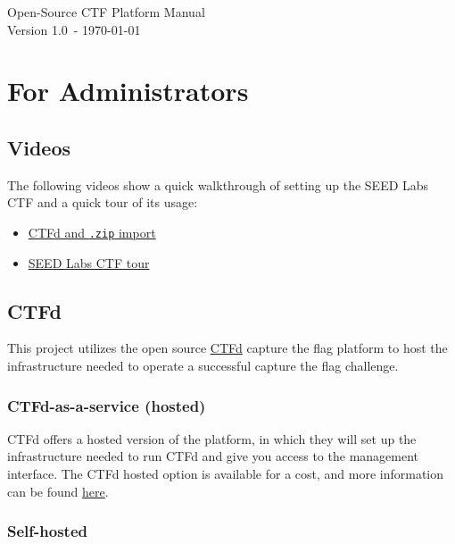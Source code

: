 \documentclass[11pt]{article}
\newcommand{\manualVersion}{1.0}
\begin{document}
\begin{center}
	{\Huge Open-Source CTF Platform Manual} \\
	{\small Version \manualVersion\ - \today}
\end{center}

\section{For Administrators}

\subsection{Videos}

The following videos show a quick walkthrough of setting up the SEED Labs CTF and a quick tour of its usage:

\begin{itemize}
	\item \href{run:https://github.com/seed-labs/seed-labs/blob/master/ctf/manual/videos/SEED_CTF_setup_part1.mp4}{CTFd and \texttt{.zip} import}
	\item \href{run:https://github.com/seed-labs/seed-labs/blob/master/ctf/manual/videos/SEED_CTF_setup_part2.mp4}{SEED Labs CTF tour}
\end{itemize}

\subsection{CTFd}

This project utilizes the open source \href{https://ctfd.io/}{CTFd} capture the flag platform to host the infrastructure needed to operate a successful capture the flag challenge.

\subsubsection{CTFd-as-a-service (hosted)}

CTFd offers a hosted version of the platform, in which they will set up the infrastructure needed to run CTFd and give you access to the management interface.
The CTFd hosted option is available for a cost, and more information can be found \href{https://ctfd.io/pricing/}{here}.

\subsubsection{Self-hosted}
\end{document}
